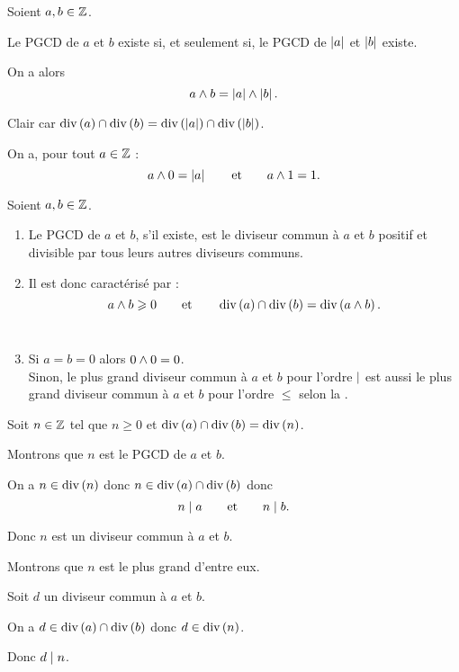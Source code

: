 \begin{rem}
Soient \(a,b\in\mathbb{Z}\).

Le PGCD de \(a\) et \(b\) existe si, et seulement si, le PGCD de \(\left\lvert a\right\rvert\) et \(\left\lvert b\right\rvert\) existe.

On a alors \[a\land b=\left\lvert a\right\rvert\land\left\lvert b\right\rvert.\]
\end{rem}

\begin{dem}
Clair car \(\operatorname{div}\left(a\right)\cap\operatorname{div}\left(b\right)=\operatorname{div}\left(\left\lvert a\right\rvert\right)\cap\operatorname{div}\left(\left\lvert b\right\rvert\right)\).
\end{dem}

\begin{rem}
On a, pour tout \(a\in\mathbb{Z}\) : \[a\land0=\left\lvert a\right\rvert\qquad\text{et}\qquad a\land1=1.\]
\end{rem}

\begin{rem}
Soient \(a,b\in\mathbb{Z}\).

\begin{enumerate}
\item Le PGCD de \(a\) et \(b\), s'il existe, est le diviseur commun à \(a\) et \(b\) positif et divisible par tous leurs autres diviseurs communs. \\

\item Il est donc caractérisé par : \[a\land b\geqslant0\qquad\text{et}\qquad\operatorname{div}\left(a\right)\cap\operatorname{div}\left(b\right)=\operatorname{div}\left(a\land b\right).\] \\

\item Si \(a=b=0\) alors \(0\land0=0\). \\ Sinon, le plus grand diviseur commun à \(a\) et \(b\) pour l'ordre \(\mid\) est aussi le plus grand diviseur commun à \(a\) et \(b\) pour l'ordre \(\leq\) selon la .
\end{enumerate}
\end{rem}

\begin{dem}[2]
Soit \(n\in\mathbb{Z}\) tel que \(n\geq0\) et \(\operatorname{div}\left(a\right)\cap\operatorname{div}\left(b\right)=\operatorname{div}\left(n\right)\).

Montrons que \(n\) est le PGCD de \(a\) et \(b\).

On a \(n\in\operatorname{div}\left(n\right)\) donc \(n\in\operatorname{div}\left(a\right)\cap\operatorname{div}\left(b\right)\) donc \[n\mid a\qquad\text{et}\qquad n\mid b.\]

Donc \(n\) est un diviseur commun à \(a\) et \(b\).

Montrons que \(n\) est le plus grand d'entre eux.

Soit \(d\) un diviseur commun à \(a\) et \(b\).

On a \(d\in\operatorname{div}\left(a\right)\cap\operatorname{div}\left(b\right)\) donc \(d\in\operatorname{div}\left(n\right)\).

Donc \(d\mid n\).
\end{dem}

